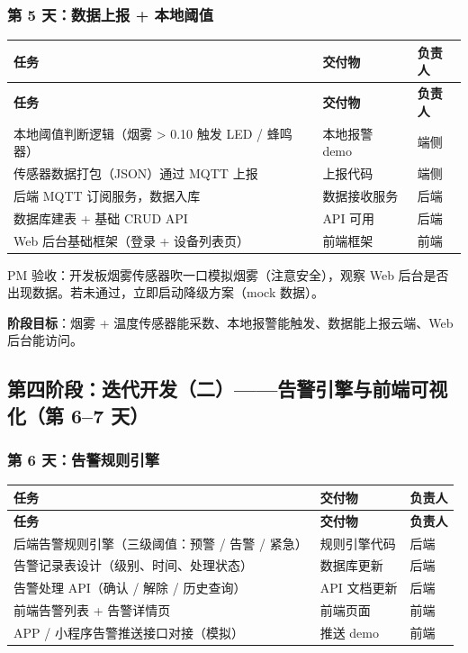\documentclass[UTF8,12pt,a4paper]{ctexart}
\begin{document}
\subsubsection{第 5 天：数据上报 + 本地阈值}

\begin{longtable}{L{6cm}L{4.5cm}C{2.5cm}}
\toprule
\textbf{任务} & \textbf{交付物} & \textbf{负责人} \\
\midrule
\endfirsthead
\toprule
\textbf{任务} & \textbf{交付物} & \textbf{负责人} \\
\midrule
\endhead
\bottomrule
\endfoot

本地阈值判断逻辑（烟雾 > 0.10 触发 LED / 蜂鸣器） & 本地报警 demo & 端侧 \\
\midrule
传感器数据打包（JSON）通过 MQTT 上报 & 上报代码 & 端侧 \\
\midrule
后端 MQTT 订阅服务，数据入库 & 数据接收服务 & 后端 \\
\midrule
数据库建表 + 基础 CRUD API & API 可用 & 后端 \\
\midrule
Web 后台基础框架（登录 + 设备列表页） & 前端框架 & 前端 \\
\bottomrule
\end{longtable}

\begin{tcolorbox}[colback=lightblue,colframe=mainblue,arc=2mm,boxrule=0.8pt,title={\faCheckCircle\ 检查点 D5 晚}]
PM 验收：开发板烟雾传感器吹一口模拟烟雾（注意安全），观察 Web 后台是否出现数据。若未通过，立即启动降级方案（mock 数据）。
\end{tcolorbox}

\textbf{阶段目标}：烟雾 + 温度传感器能采数、本地报警能触发、数据能上报云端、Web 后台能访问。

\subsection{第四阶段：迭代开发（二）——告警引擎与前端可视化（第 6--7 天）}

\subsubsection{第 6 天：告警规则引擎}

\begin{longtable}{L{6cm}L{4.5cm}C{2.5cm}}
\toprule
\textbf{任务} & \textbf{交付物} & \textbf{负责人} \\
\midrule
\endfirsthead
\toprule
\textbf{任务} & \textbf{交付物} & \textbf{负责人} \\
\midrule
\endhead
\bottomrule
\endfoot

后端告警规则引擎（三级阈值：预警 / 告警 / 紧急） & 规则引擎代码 & 后端 \\
\midrule
告警记录表设计（级别、时间、处理状态） & 数据库更新 & 后端 \\
\midrule
告警处理 API（确认 / 解除 / 历史查询） & API 文档更新 & 后端 \\
\midrule
前端告警列表 + 告警详情页 & 前端页面 & 前端 \\
\midrule
APP / 小程序告警推送接口对接（模拟） & 推送 demo & 前端 \\
\bottomrule
\end{longtable}
\end{document}
